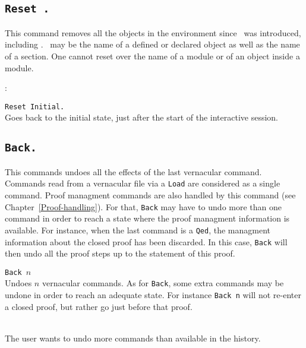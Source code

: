 \subsection[\tt Reset \ident.]{\tt Reset \ident.}
This command removes all the objects in the environment since \ident\ 
was introduced, including \ident. \ident\ may be the name of a defined
or declared object as well as the name of a section. One cannot reset
over the name of a module or of an object inside a module.

\begin{ErrMsgs}
\item \ident: 
\end{ErrMsgs}

\begin{Variants}
 \item {\tt Reset Initial.}\comindex{Reset Initial}\\
   Goes back to the initial state, just after the start of the
   interactive session.
\end{Variants}

\subsection[\tt Back.]{\tt Back.\comindex{Back}}

This commands undoes all the effects of the last vernacular
command. Commands read from a vernacular file via a {\tt Load} are
considered as a single command. Proof managment commands
are also handled by this command (see Chapter~\ref{Proof-handling}).
For that, {\tt Back} may have to undo more than one command in order
to reach a state where the proof managment information is available.
For instance, when the last command is a {\tt Qed}, the managment
information about the closed proof has been discarded. In this case,
{\tt Back} will then undo all the proof steps up to the statement of
this proof.

\begin{Variants}
\item {\tt Back $n$} \\
  Undoes $n$ vernacular commands. As for {\tt Back}, some extra
  commands may be undone in order to reach an adequate state.
  For instance {\tt Back n} will not re-enter a closed proof,
  but rather go just before that proof.
\end{Variants}

\begin{ErrMsgs}
\item {} \\
  The user wants to undo more commands than available in the history.
\end{ErrMsgs}

